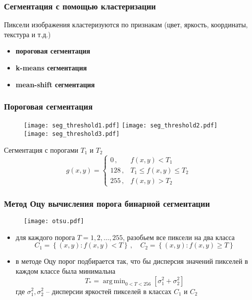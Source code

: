\documentclass[12pt, usepdftitle=false, aspectratio=1610]{beamer}
\DeclareMathOperator*{\argmin}{arg\,min}
\begin{document}
\begin{frame}
\frametitle{Сегментация с помощью кластеризации}
Пиксели изображения кластеризуются по признакам (цвет, яркость, координаты, текстура и т.д.)

\begin{itemize}
    \item \textbf{пороговая сегментация}
    \item \textbf{k-means сегментация}
    \item \textbf{mean-shift сегментация}
\end{itemize}
\end{frame}

\begin{frame}
\frametitle{Пороговая сегментация}
\begin{figure}
    \centering
    \texttt{[image: seg\_threshold1.pdf]}
    \texttt{[image: seg\_threshold2.pdf]}
    \texttt{[image: seg\_threshold3.pdf]}
\end{figure}

Сегментация с порогами $T_1$ и $T_2$
$$
    g(x, y) =
    \begin{cases}
        0\,, & f(x,y) < T_1 \\        
        128\,, & T_1 \leqslant f(x,y) \leqslant T_2 \\
        255\,, & f(x,y) > T_2 
    \end{cases}
$$
\end{frame}

\begin{frame}
\frametitle{Метод Оцу вычисления порога бинарной сегментации}
\begin{figure}
    \centering
    \texttt{[image: otsu.pdf]}
\end{figure}

\begin{itemize}
    \item для каждого порога $T=1,2,\ldots,255$, разобьем все пиксели на два класса
    $$
        C_1 = \left\{(x,y): f(x,y) < T\right\}\,,\quad
        C_2 = \left\{(x,y): f(x,y) \geqslant T\right\}
    $$
    \item в методе Оцу порог подбирается так, что бы дисперсия значений пикселей в каждом классе была минимальна
    $$
        T_\ast=\argmin_{0 < T < 256} 
        \left[\sigma_1^2  + \sigma_2^2\right]
    $$
    где $\sigma_1^2, \sigma_2^2$ -- дисперсии яркостей пикселей в классах $C_1$ и $C_2$
\end{itemize}
\end{frame}

\end{document}
